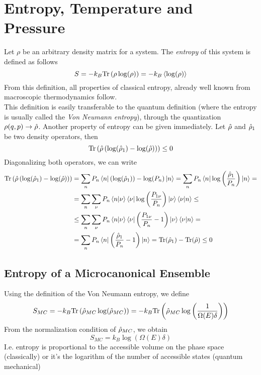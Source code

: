 \documentclass[../qm.tex]{subfiles}
\begin{document}
		\section{Entropy, Temperature and Pressure}
		Let $\rho$ be an arbitrary density matrix for a system. The \textit{entropy} of this system is defined as follows
		\begin{equation}
			S=-k_B\mathrm{Tr}\left( \rho\log(\rho) \right)=-k_B\expval{\log(\rho)}
			\label{eq:generalentropy}
		\end{equation}
		From this definition, all properties of classical entropy, already well known from macroscopic thermodynamics follow.\\
		This definition is easily transferable to the quantum definition (where the entropy is usually called the \textit{Von Neumann entropy}), through the quantization $\rho(q,p)\to\hat{\rho}$. Another property of entropy can be given immediately. Let $\hat{\rho}$ and $\hat{\rho}_1$ be two density operators, then
		\begin{equation}
			\mathrm{Tr}\left( \hat{\rho}\left( \log(\hat{\rho}_1)-\log(\hat{\rho}) \right) \right)\le0
			\label{eq:entropypropertynegativetrace}
		\end{equation}
		Diagonalizing both operators, we can write
		\begin{equation*}
			\begin{aligned}
				\mathrm{Tr}\left( \hat{\rho}\left( \log(\hat{\rho}_1)-\log(\hat{\rho}) \right) \right)&=\sum_nP_n\bra{n}(\log(\hat{\rho}_1))-\log(P_n)\ket{n}=\sum_nP_n\bra{n}\log\left( \frac{\hat{\rho}_1}{P_n} \right)\ket{n}=\\
				&=\sum_n\sum_\nu P_n\bra{n}\ket{\nu}\bra{\nu}\log\left( \frac{P_{1\nu}}{P_n} \right)\ket{\nu}\bra{\nu}\ket{n}\le\\
				&\le\sum_n\sum_\nu P_n\bra{n}\ket{\nu}\bra{\nu}\left( \frac{P_{1\nu}}{P_n}-1 \right)\ket{\nu}\bra{\nu}\ket{n}=\\
				&=\sum_nP_n\bra{n}\left( \frac{\hat{\rho}_1}{P_n}-1 \right)\ket{n}=\mathrm{Tr}(\hat{\rho}_1)-\mathrm{Tr}(\hat{\rho})\le0
			\end{aligned}
		\end{equation*}
		\subsection{Entropy of a Microcanonical Ensemble}
		Using the definition of the Von Neumann entropy, we define
		\begin{equation*}
			S_{MC}=-k_B\mathrm{Tr}\left( \hat{\rho}_{MC}\log(\hat{\rho}_{MC}) \right)=-k_B\mathrm{Tr}\left( \hat{\rho}_{MC}\log\left( \frac{1}{\Omega(E)\delta} \right) \right)
		\end{equation*}
		From the normalization condition of $\hat{\rho}_{MC}$, we obtain
		\begin{equation}
			S_{MC}=k_B\log\left( \Omega(E)\delta \right)
			\label{eq:microcanonicalentropy}
		\end{equation}
		I.e. entropy is proportional to the accessible volume on the phase space (classically) or it's the logarithm of the number of accessible states (quantum mechanical)\\
\end{document}
